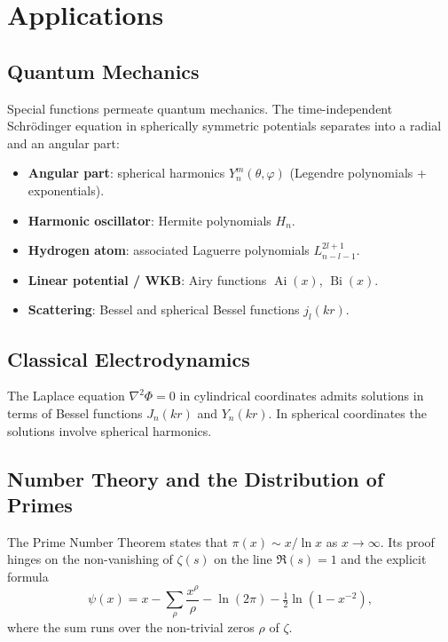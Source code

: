 \documentclass[12pt,a4paper]{amsart}
\theoremstyle{definition}
\begin{document}
\section{Applications}
\label{sec:applications}

\subsection{Quantum Mechanics}

Special functions permeate quantum mechanics.  The time-independent Schr\"odinger equation
in spherically symmetric potentials separates into a radial and an angular part:
\begin{itemize}
  \item \textbf{Angular part}: spherical harmonics \(Y_n^m(\theta,\varphi)\)
        (Legendre polynomials + exponentials).
  \item \textbf{Harmonic oscillator}: Hermite polynomials \(H_n\).
  \item \textbf{Hydrogen atom}: associated Laguerre polynomials \(L_{n-l-1}^{2l+1}\).
  \item \textbf{Linear potential / WKB}: Airy functions \(\operatorname{Ai}(x)\),
        \(\operatorname{Bi}(x)\).
  \item \textbf{Scattering}: Bessel and spherical Bessel functions \(j_l(kr)\).
\end{itemize}

\subsection{Classical Electrodynamics}

The Laplace equation \(\nabla^2\Phi = 0\) in cylindrical coordinates admits solutions in
terms of Bessel functions \(J_n(kr)\) and \(Y_n(kr)\).  In spherical coordinates the
solutions involve spherical harmonics.

\subsection{Number Theory and the Distribution of Primes}

The Prime Number Theorem states that \(\pi(x) \sim x/\ln x\) as \(x \to \infty\).
Its proof hinges on the non-vanishing of \(\zeta(s)\) on the line \(\Re(s) = 1\) and
the explicit formula
\[
  \psi(x) = x - \sum_\rho \frac{x^\rho}{\rho} - \ln(2\pi) - \tfrac{1}{2}\ln(1-x^{-2}),
\]
where the sum runs over the non-trivial zeros \(\rho\) of \(\zeta\).
\end{document}
